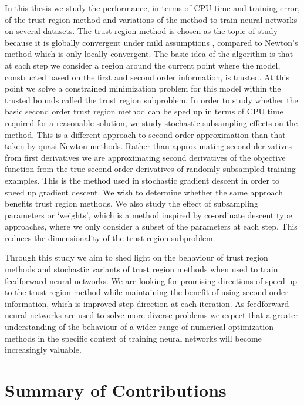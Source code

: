 \documentclass[letterpaper,12pt,titlepage,oneside,final]{book}
\begin{document}
	In this thesis we study the performance, in terms of CPU time and training error, of the trust region method and variations of the method to train neural networks on several datasets. The trust region method is chosen as the topic of study because it is globally convergent under mild assumptions \cite{shultz1985family}, compared to Newton's method which is only locally convergent. The basic idea of the algorithm is that at each step we consider a region around the current point where the model, constructed based on the first and second order information, is trusted. At this point we solve a constrained minimization problem for this model within the trusted bounds called the trust region subproblem. In order to study whether the basic second order trust region method can be sped up in terms of CPU time required for a reasonable solution, we study stochastic subsampling effects on the method. This is a different approach to second order approximation than that taken by quasi-Newton methods. Rather than approximating second derivatives from first derivatives we are approximating second derivatives of the objective function from the true second order derivatives of randomly subsampled training examples. This is the method used in stochastic gradient descent in order to speed up gradient descent. We wish to determine whether the same approach benefits trust region methods. We also study the effect of subsampling parameters or `weights', which is a method inspired by co-ordinate descent type approaches, where we only consider a subset of the parameters at each step. This reduces the dimensionality of the trust region subproblem.
	
	Through this study we aim to shed light on the behaviour of trust region methods and stochastic variants of trust region methods when used to train feedforward neural networks. We are looking for promising directions of speed up to the trust region method while maintaining the benefit of using second order information, which is improved step direction at each iteration. As feedforward neural networks are used to solve more diverse problems we expect that a greater understanding of the behaviour of a wider range of numerical optimization methods in the specific context of training neural networks will become increasingly valuable.
	
	\section{Summary of Contributions}
	
\end{document}
